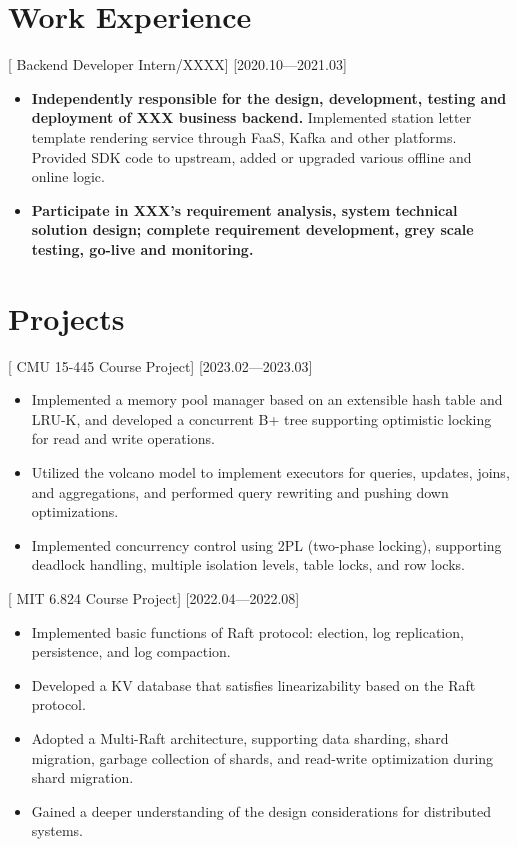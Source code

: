 \documentclass{resume}
\begin{document}
\section*{Work Experience}

[ Backend Developer Intern/XXXX]
[2020.10—2021.03] 

\begin{itemize}
   \item \textbf{Independently responsible for the design, development, testing and deployment of XXX business backend.} Implemented station letter template rendering service through FaaS, Kafka and other platforms. Provided SDK code to upstream, added or upgraded various offline and online logic.
  \item \textbf{Participate in XXX's requirement analysis, system technical solution design; complete requirement development, grey scale testing, go-live and monitoring.}
\end{itemize}

\section*{Projects}

[ \textnormal{CMU 15-445} Course Project]
[2023.02—2023.03]
\begin{itemize}
  \item Implemented a memory pool manager based on an extensible hash table and LRU-K, and developed a concurrent B+ tree supporting optimistic locking for read and write operations.
  \item Utilized the volcano model to implement executors for queries, updates, joins, and aggregations, and performed query rewriting and pushing down optimizations.
  \item Implemented concurrency control using 2PL (two-phase locking), supporting deadlock handling, multiple isolation levels, table locks, and row locks.
\end{itemize}


[ \textnormal{MIT 6.824} Course Project]
[2022.04—2022.08]
\begin{itemize}
  \item Implemented basic functions of Raft protocol: election, log replication, persistence, and log compaction.
  \item Developed a KV database that satisfies linearizability based on the Raft protocol.
  \item Adopted a Multi-Raft architecture, supporting data sharding, shard migration, garbage collection of shards, and read-write optimization during shard migration.
  \item Gained a deeper understanding of the design considerations for distributed systems.
\end{itemize}
\end{document}
